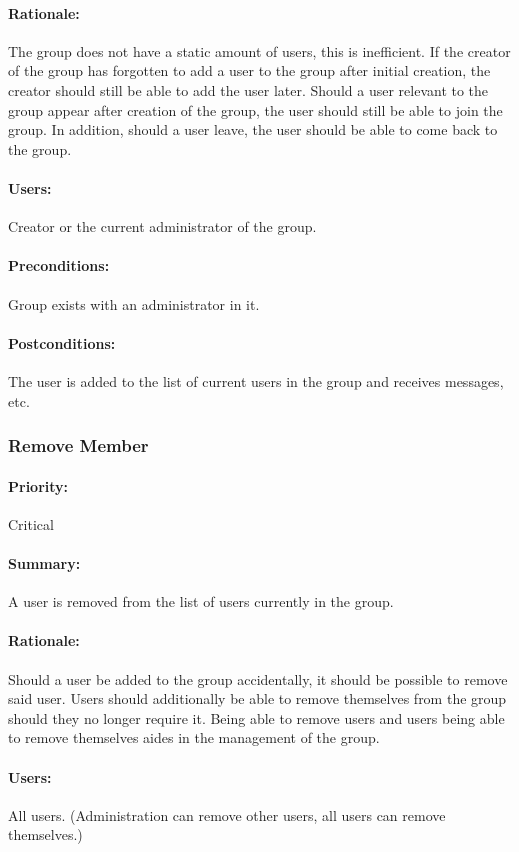 \documentclass[11pt]{article}
\begin{document}
\paragraph{Rationale:}
The group does not have a static amount of users, this is inefficient. If the creator of the group has forgotten to add a user to the group after initial creation, the creator should still be able to add the user later. Should a user relevant to the group appear after creation of the group, the user should still be able to join the group. In addition, should a user leave, the user should be able to come back to the group.
\paragraph{Users:}
Creator or the current administrator of the group.
\paragraph{Preconditions:}
Group exists with an administrator in it.
\paragraph{{Postconditions:}}
The user is added to the list of current users in the group and receives messages, etc.
\subsubsection{Remove Member} \label{UC-remove-member}
\paragraph{Priority:} Critical
\paragraph{Summary:}
A user is removed from the list of users currently in the group.
\paragraph{Rationale:}
Should a user be added to the group accidentally, it should be possible to remove said user. Users should additionally be able to remove themselves from the group should they no longer require it. Being able to remove users and users being able to remove themselves aides in the management of the group.
\paragraph{Users:}
All users. (Administration can remove other users, all users can remove themselves.)
\end{document}
